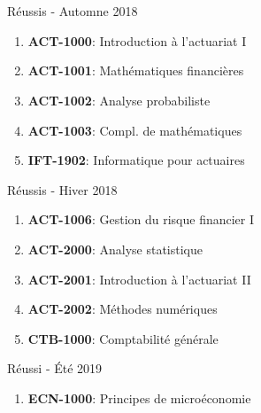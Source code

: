 \documentclass[9pt, french]{article}
\begin{document}
\section*{}


\bigskip

\begin{multicols*}{3}


\medskip

\begin{algo}{Réussis - Automne 2018}
\begin{enumerate}
	\item[] \textbf{ACT-1000}: Introduction à l’actuariat I
	\item[] \textbf{ACT-1001}: Mathématiques financières
	\item[] \textbf{ACT-1002}: Analyse probabiliste 
	\item[] \textbf{ACT-1003}: Compl. de mathématiques
	\item[] \textbf{IFT-1902}: Informatique pour actuaires
\end{enumerate}
\end{algo}


\bigskip


\begin{algo}{Réussis - Hiver 2018}
\begin{enumerate}
	\item[] \textbf{ACT-1006}: Gestion du risque financier I              
	\item[] \textbf{ACT-2000}: Analyse statistique
	\item[] \textbf{ACT-2001}: Introduction à l’actuariat II
	\item[] \textbf{ACT-2002}: Méthodes numériques   
	\item[] \textbf{CTB-1000}: Comptabilité générale
\end{enumerate}
\end{algo}


\bigskip


\begin{algo}{Réussi - Été 2019}
\begin{enumerate}
	\item[] \textbf{ECN-1000}: Principes de microéconomie                    
\end{enumerate}
\end{algo}


\end{multicols*}
\end{document}
